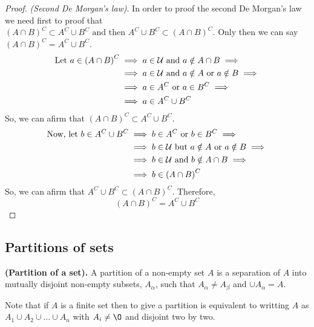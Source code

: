 \begin{proof}
    \textit{(Second De Morgan's law)}. In order to proof the second De Morgan's law we need first to proof that $\left( A\cap B \right)^C\subset A^C\cup B^C \textrm{ and then } A^C\cup B^C \subset \left(  A\cap B\right)^C$. Only then we can say $\left( A\cap B \right)^C = A^C\cup B^C $. 
    \begin{align}
        \textrm{Let } a\in\left( A\cap B \right)^C &\implies a\in\mathcal{U}\textrm{ and } a\notin A\cap B \implies \\
                                     &\implies a\in\mathcal{U}\textrm{ and } a\notin A\textrm{ or } a\notin B \implies \\ &\implies a\in A^C\textrm{ or } a\in B^C \implies \\
                                                         &\implies a\in A^C\cup B^C
    \end{align}
    So, we can afirm that $\left( A\cap B \right)^C \subset A^C\cup B^C $.
    \begin{align}
        \textrm{Now, let } b\in A^C\cup B^C &\implies b\in A^C\textrm{ or } b\in B^C \implies \\
                                            &\implies b\in\mathcal{U}\textrm{ but } a\notin A\textrm{ or } a\notin B \implies \\ &\implies b\in\mathcal{U}\textrm{ and } b\notin A\cap B \implies \\
                                            &\implies b\in \left( A\cap B \right)^C
    \end{align}
    So, we can afirm that $A^C\cup B^C\subset\left( A\cap B \right)^C $. Therefore,
    \begin{equation}
        \left( A\cap B \right)^C = A^C\cup B^C
    \end{equation}

\end{proof}

\subsection{Partitions of sets}
\begin{definition}
    \textbf{(Partition of a set).} A partition of a non-empty set $A$ is a separation of $A$ into mutually disjoint non-empty subsets, $A_{\alpha}$, such that $A_{\alpha}\neq A_{\beta}$ and $\cup A_{\alpha} = A$.
\end{definition}
\begin{remark}
    Note that if $A$ is a finite set then to give a partition is equivalent to writting $A$ as $A_1\cup A_2\cup\ldots\cup A_{n} $ with $A_i\neq \O$ and disjoint two by two.
\end{remark}

